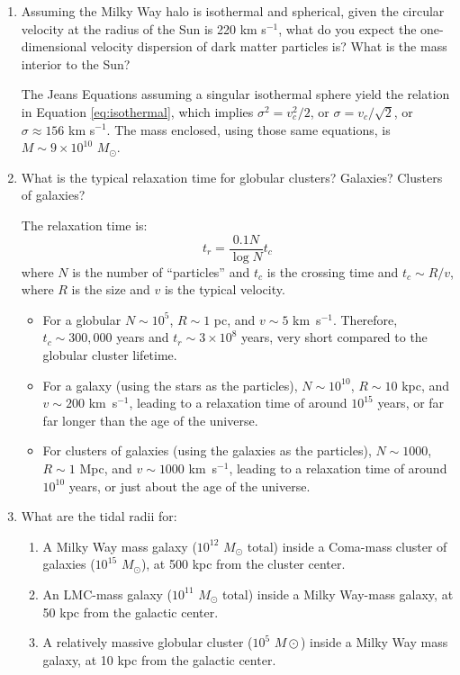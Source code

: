 \begin{enumerate} 
\item Assuming the Milky Way halo is isothermal and spherical, given
    the circular velocity at the radius of the Sun is 220 km s$^{-1}$,
    what do you expect the one-dimensional velocity dispersion of dark
    matter particles is? What is the mass interior to the Sun?

\begin{answer}
The Jeans Equations assuming a singular isothermal sphere yield the
relation in Equation \ref{eq:isothermal}, which implies
$\sigma^2 = v_c^2/2$, or $\sigma = v_c / \sqrt{2}$, or $\sigma \approx
156$ km s$^{-1}$. The mass enclosed, using those same equations, is
$M\sim 9\times 10^{10}$ $M_\odot$.
\end{answer}

\item What is the typical relaxation time for globular clusters?
    Galaxies? Clusters of galaxies?

\begin{answer}
The relaxation time is:
\begin{equation}
t_r = \frac{0.1 N}{\log N} t_c
\end{equation}
where $N$ is the number of ``particles'' and $t_c$ is the crossing
time and $t_c \sim R/v$, where $R$ is the size and $v$ is the typical
velocity.
\begin{itemize}
\item For a globular $N\sim 10^5$, $R\sim 1$ pc, and $v\sim 5$
km~s$^{-1}$.  Therefore, $t_c\sim 300,000$ years and $t_r \sim 3\times
10^8$ years, very short compared to the globular cluster lifetime.
\item For a galaxy (using the stars as the particles), $N\sim
10^{10}$, $R\sim 10$ kpc, and $v\sim 200$ km~s$^{-1}$, leading to a
relaxation time of around $10^{15}$ years, or far far longer than the
age of the universe.
\item For clusters of galaxies (using the galaxies as the particles),
$N\sim 1000$, $R\sim 1$ Mpc, and $v\sim 1000$ km~s$^{-1}$, leading to
a relaxation time of around $10^{10}$ years, or just about the age of
the universe.
\end{itemize}
\end{answer}

\item What are the tidal radii for:
\begin{enumerate}
\item A Milky Way mass galaxy ($10^{12}$ $M_\odot$ total) inside a
Coma-mass cluster of galaxies ($10^{15}$ $M_\odot$), 
at 500 kpc from the cluster center.
\item An LMC-mass galaxy ($10^{11}$ $M_\odot$ total) inside a
Milky Way-mass galaxy, at 50 kpc from the galactic center.
\item A relatively massive globular cluster ($10^5$ $M\odot$) inside a
Milky Way mass galaxy, at 10 kpc from the galactic center.
\end{enumerate}


\end{enumerate}
